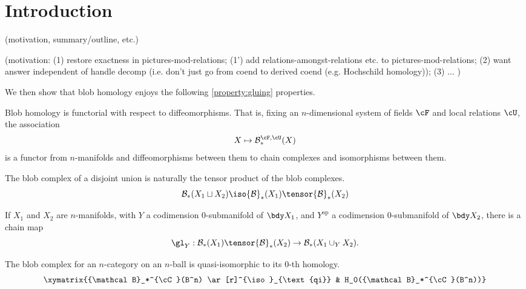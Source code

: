 \documentclass[11pt,leqno]{amsart}
\def\bc{{\mathcal B}}
\begin{document}
\section{Introduction}

(motivation, summary/outline, etc.)

(motivation:
(1) restore exactness in pictures-mod-relations;
(1') add relations-amongst-relations etc. to pictures-mod-relations;
(2) want answer independent of handle decomp (i.e. don't
just go from coend to derived coend (e.g. Hochschild homology));
(3) ...
)



We then show that blob homology enjoys the following
\ref{property:gluing} properties.

\begin{property}[Functoriality]
\label{property:functoriality}%
Blob homology is functorial with respect to diffeomorphisms. That is, fixing an $n$-dimensional system of fields $\cF$ and local relations $\cU$, the association
\begin{equation*}
X \mapsto \bc_*^{\cF,\cU}(X)
\end{equation*}
is a functor from $n$-manifolds and diffeomorphisms between them to chain complexes and isomorphisms between them.
\end{property}

\begin{property}
\label{property:disjoint-union}
The blob complex of a disjoint union is naturally the tensor product of the blob complexes.
\begin{equation*}
\bc_*(X_1 \sqcup X_2) \iso \bc_*(X_1) \tensor \bc_*(X_2)
\end{equation*}
\end{property}

\begin{property}
\label{property:gluing-map}%
If $X_1$ and $X_2$ are $n$-manifolds, with $Y$ a codimension $0$-submanifold of $\bdy X_1$, and $Y^{\text{op}}$ a codimension $0$-submanifold of $\bdy X_2$,
there is a chain map
\begin{equation*}
\gl_Y: \bc_*(X_1) \tensor \bc_*(X_2) \to \bc_*(X_1 \cup_Y X_2).
\end{equation*}
\end{property}

\begin{property}[Contractibility]
\label{property:contractibility}%
The blob complex for an $n$-category on an $n$-ball is quasi-isomorphic to its $0$-th homology.
\begin{equation}
\xymatrix{\bc_*^{\cC}(B^n) \ar[r]^{\iso}_{\text{qi}} & H_0(\bc_*^{\cC}(B^n))}
\end{equation}
\end{property}
\end{document}
